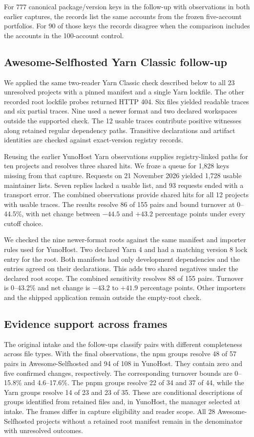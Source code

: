 For 777 canonical package/version keys in the follow-up with observations
in both earlier captures, the records list the same accounts from the
frozen five-account portfolios. For 90 of those keys the records disagree
when the comparison includes the accounts in the 100-account control.

\subsection{Awesome-Selfhosted Yarn Classic follow-up}
We applied the same two-reader Yarn Classic check described below to all
23 unresolved projects with a pinned manifest and a single Yarn lockfile.
The other recorded root lockfile probes returned HTTP 404. Six files
yielded readable traces and six partial traces. Nine used a newer format
and two declared workspaces outside the supported check. The 12 usable
traces contribute positive witnesses along retained regular dependency
paths. Transitive declarations and artifact identities are checked
against exact-version registry records.

Reusing the earlier YunoHost Yarn observations supplies registry-linked
paths for ten projects and resolves three shared hits. We froze a queue
for 1,828 keys missing from that capture. Requests on 21 November 2026
yielded 1,728 usable maintainer lists. Seven replies lacked a usable list,
and 93 requests ended with a transport error. The combined observations
provide shared hits for all 12 projects with usable traces. The results
resolve 86 of 155 pairs and bound turnover at 0--44.5\%, with net change
between $-44.5$ and $+43.2$ percentage points under every cutoff choice.

We checked the nine newer-format roots against the same manifest and
importer rules used for YunoHost. Two declared Yarn 4 and had a matching
version 8 lock entry for the root. Both manifests had only development
dependencies and the entries agreed on their declarations. This adds
two shared negatives under the declared root scope. The combined
sensitivity resolves 88 of 155 pairs. Turnover is 0--43.2\% and net change is $-43.2$ to $+41.9$
percentage points. Other importers and the shipped application remain
outside the empty-root check.

\subsection{Evidence support across frames}
The original intake and the follow-ups classify pairs with different
completeness across file types. With the final observations, the npm
groups resolve 48 of 57 pairs in Awesome-Selfhosted and 94 of 108 in
YunoHost. They contain zero and five confirmed changes, respectively.
The corresponding turnover bounds are 0--15.8\% and 4.6--17.6\%.
The pnpm groups resolve 22 of 34 and 37 of 44, while the Yarn groups
resolve 14 of 23 and 23 of 35. These are conditional descriptions of
groups identified from retained files and, in YunoHost, the manager
selected at intake. The frames differ in capture eligibility and reader
scope. All 28 Awesome-Selfhosted projects without a retained root
manifest remain in the denominator with unresolved outcomes.

